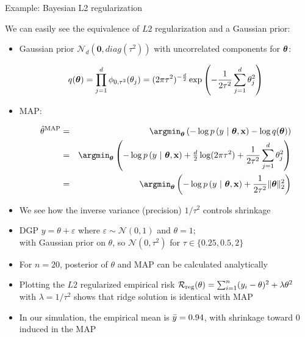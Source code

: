 \documentclass[11pt,compress,t,notes=noshow, xcolor=table]{beamer}
\begin{document}
\begin{vbframe}{Example: Bayesian L2 regularization}

\small We can easily see the equivalence of $L2$ regularization and a Gaussian 
prior:

\begin{itemize}
  \small
  \item Gaussian prior $\mathcal{N}_d(\bm{0}, \mathit{diag}(\tau^2))$ with uncorrelated components for $\bm{\theta}$:
  \begin{footnotesize}
    $$q(\bm{\theta}) = \prod_{j = 1}^d  \phi_{0,\tau^2}(\theta_j) 
    = (2\pi\tau^2)^{-\frac{d}{2}} \exp \left( - \frac{1}{2\tau^2} \sum_{j = 1}^d 
    \theta_j^2 \right)$$
  \end{footnotesize} 
  \item MAP:
  \begin{footnotesize}
  \begin{eqnarray*}
    \thetah^{\text{MAP}} &=& \argmin_{\thetav} \left(
    - \log p\left(y ~|~ \thetav, \xv \right) - \log q(\thetav)
    \right) \\
    &=& \argmin_{\thetav} \left(
    - \log p\left(y ~|~ \thetav, \xv \right) + \tfrac{d}{2} \log(2\pi \tau^2) +
    \frac{1}{2\tau^2} \sum_{j = 1}^d \theta_j^2
    \right) \\
    &=& \argmin_{\thetav} \left(
    - \log p\left(y ~|~ \thetav, \xv \right) + \frac{1}{2\tau^2} \| \thetav \|_2^2
    \right)
  \end{eqnarray*}
  \end{footnotesize} 
  \item We see how the inverse variance (precision) $1/\tau^2$ controls shrinkage
\end{itemize}

\framebreak

\begin{itemize}
    \item DGP $y = \theta + \varepsilon$ where $\varepsilon \sim \mathcal{N}(0,1)$ and $\theta=1$;\\
    with Gaussian prior on $\theta$, so $\mathcal{N}(0, \tau^2)$ for $\tau \in \{0.25, 0.5, 2\}$
    \item For $n=20$, posterior of $\theta$ and MAP can be calculated analytically
    \item Plotting the $L2$ regularized empirical risk $\mathcal{R}_{\text{reg}}(\theta) = \sum_{i=1}^{n} (y_i-\theta)^2+\lambda \theta^2$ with $\lambda = 1/\tau^2$ shows that ridge solution is identical with MAP
    \item In our simulation, the empirical mean is $\Bar{y}=0.94$, with shrinkage toward $0$ induced in the MAP
\end{itemize}


\end{vbframe}
\end{document}
